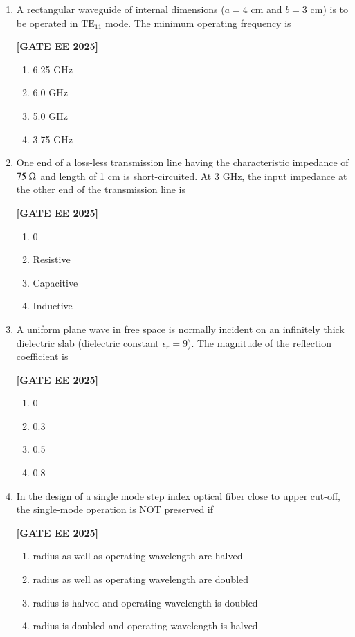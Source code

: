 \documentclass[12pt]{article}
\begin{document}
\begin{enumerate}[leftmargin=*, label=\textbf{Q.\arabic*:}]
\item A rectangular waveguide of internal dimensions ($a=4$ cm and $b=3$ cm) is to be operated in $\mathrm{TE}_{11}$ mode. The minimum operating frequency is
 
\noindent \textbf{[GATE EE 2025]}
\begin{multicols}{4}
\begin{enumerate}
  \item 6.25 GHz
  \item 6.0 GHz
  \item 5.0 GHz
  \item 3.75 GHz
\end{enumerate}
\end{multicols}

\item One end of a loss-less transmission line having the characteristic impedance of $75\;\ohm$ and length of 1 cm is short-circuited. At 3 GHz, the input impedance at the other end of the transmission line is
 
\noindent \textbf{[GATE EE 2025]}
\begin{multicols}{4}
\begin{enumerate}
  \item 0
  \item Resistive
  \item Capacitive
  \item Inductive
\end{enumerate}
\end{multicols}

\item A uniform plane wave in free space is normally incident on an infinitely thick dielectric slab (dielectric constant $\epsilon_r = 9$). The magnitude of the reflection coefficient is
 
\noindent \textbf{[GATE EE 2025]}
\begin{multicols}{4}
\begin{enumerate}
  \item 0
  \item 0.3
  \item 0.5
  \item 0.8
\end{enumerate}
\end{multicols}

\item In the design of a single mode step index optical fiber close to upper cut-off, the single-mode operation is NOT preserved if
 
\noindent \textbf{[GATE EE 2025]}
\begin{enumerate}
  \item radius as well as operating wavelength are halved
  \item radius as well as operating wavelength are doubled
  \item radius is halved and operating wavelength is doubled
  \item radius is doubled and operating wavelength is halved
\end{enumerate}


\end{enumerate}
\end{document}
